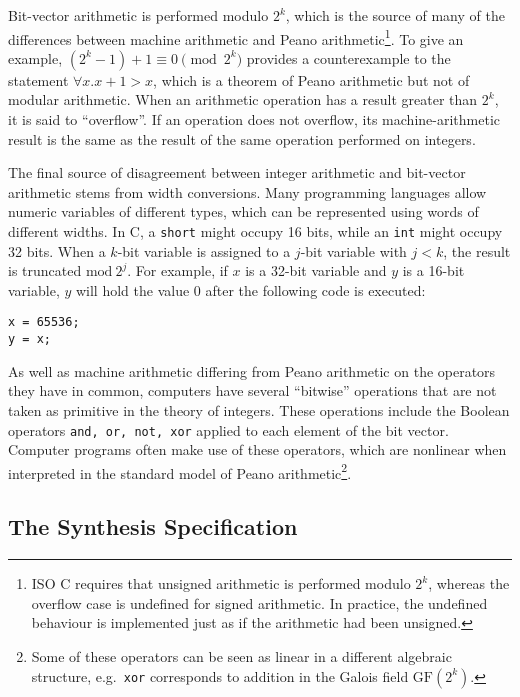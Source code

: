 \documentclass[preprint]{sigplanconf}
\theoremstyle{definition}
\begin{document}
Bit-vector arithmetic is performed modulo $2^k$, which is the source of many
of the differences between machine arithmetic and Peano
arithmetic\footnote{ISO C requires that unsigned arithmetic is performed
modulo $2^k$, whereas the overflow case is undefined for signed arithmetic. 
In practice, the undefined behaviour is implemented just as if the
arithmetic had been unsigned.}.  To give an example, $(2^k - 1) + 1 \equiv 0
\pmod {2^k}$ provides a counterexample to the statement $\forall x. 
x + 1 > x$, which is a theorem of Peano arithmetic but not of modular
arithmetic.  When an arithmetic operation has a result greater than $2^k$,
it is said to ``overflow''.  If an operation does not overflow, its
machine-arithmetic result is the same as the result of the same operation
performed on integers.

The final source of disagreement between integer arithmetic and bit-vector
arithmetic stems from width conversions.  Many programming languages allow
numeric variables of different types, which can be represented using words
of different widths.  In C, a \texttt{short} might occupy 16 bits, while an
\texttt{int} might occupy 32 bits.  When a $k$-bit variable is assigned to a
$j$-bit variable with $j < k$, the result is truncated $\mathrm{mod}~2^j$.  For
example, if $x$ is a 32-bit variable and $y$ is a 16-bit variable, $y$ will
hold the value $0$ after the following code is executed:
%
\begin{lstlisting}
x = 65536;
y = x;
\end{lstlisting}


As well as machine arithmetic differing from Peano arithmetic on the
operators they have in common, computers have several ``bitwise'' operations
that are not taken as primitive in the theory of integers.  These operations
include the Boolean operators \texttt{and, or, not, xor} applied to each
element of the bit vector.  Computer programs often make use of these
operators, which are nonlinear when interpreted in the standard model of
Peano arithmetic\footnote{Some of these operators can be seen as
linear in a different algebraic structure, e.g.~\texttt{xor} corresponds to
addition in the Galois field $\mathrm{GF}(2^k)$.}.

\subsection{The Synthesis Specification}
\end{document}

